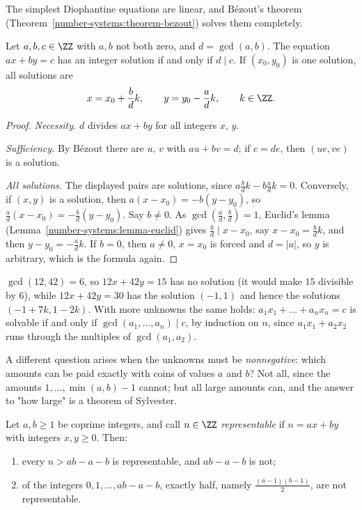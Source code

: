 The simplest Diophantine equations are linear, and Bézout's theorem (Theorem~\ref{number-systems:theorem-bezout}) solves them completely.

\begin{proposition}\label{diophantine-equations:proposition-linear}
Let $a, b, c \in \ZZ$ with $a, b$ not both zero, and $d = \gcd(a, b)$. The equation $ax + by = c$ has an integer solution if and only if $d \mid c$. If $(x_0, y_0)$ is one solution, all solutions are
\[
x = x_0 + \frac bd k, \qquad y = y_0 - \frac ad k, \qquad k \in \ZZ.
\]
\end{proposition}

\begin{proof}
\emph{Necessity.} $d$ divides $ax + by$ for all integers $x$, $y$.

\emph{Sufficiency.} By Bézout there are $u$, $v$ with $au + bv = d$; if $c = de$, then $(ue, ve)$ is a solution.

\emph{All solutions.} The displayed pairs are solutions, since $a\frac bd k - b\frac ad k = 0$. Conversely, if $(x, y)$ is a solution, then $a(x - x_0) = -b(y - y_0)$, so
$\frac ad(x - x_0) = -\frac bd(y - y_0)$. Say $b \neq 0$. As $\gcd(\frac ad, \frac bd) = 1$, Euclid's lemma (Lemma~\ref{number-systems:lemma-euclid}) gives $\frac bd \mid x - x_0$, say $x - x_0 = \frac bd k$,
and then $y - y_0 = -\frac ad k$. If $b = 0$, then $a \neq 0$, $x = x_0$ is forced and $d = |a|$, so $y$ is arbitrary, which is the formula again.
\end{proof}

\begin{example}\label{diophantine-equations:example-linear}
$\gcd(12, 42) = 6$, so $12x + 42y = 15$ has no solution (it would make $15$ divisible by $6$), while $12x + 42y = 30$ has the solution $(-1, 1)$ and hence the solutions $(-1 + 7k, 1 - 2k)$. With more unknowns
the same holds: $a_1x_1 + \dots + a_nx_n = c$ is solvable if and only if $\gcd(a_1, \dots, a_n) \mid c$, by induction on $n$, since $a_1x_1 + a_2x_2$ runs through the multiples of $\gcd(a_1, a_2)$.
\end{example}

A different question arises when the unknowns must be \emph{nonnegative}: which amounts can be paid exactly with coins of values $a$ and $b$? Not all, since the amounts $1, \dots, \min(a, b) - 1$ cannot; but all
large amounts can, and the answer to "how large" is a theorem of Sylvester.

\begin{theorem}[Sylvester]\label{diophantine-equations:theorem-frobenius}
Let $a, b \geq 1$ be coprime integers, and call $n \in \ZZ$ \emph{representable} if $n = ax + by$ with integers $x, y \geq 0$. Then:
\begin{enumerate}
\item every $n > ab - a - b$ is representable, and $ab - a - b$ is not;
\item of the integers $0, 1, \dots, ab - a - b$, exactly half, namely $\frac{(a - 1)(b - 1)}{2}$, are not representable.
\end{enumerate}
\end{theorem}

